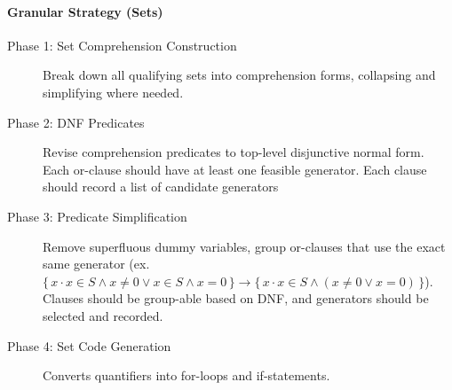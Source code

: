 \documentclass{article}
\newcommand{\bSetT}[2]{%
  \{\, #1 \cdot #2 \,\}%
}
\begin{document}
\paragraph{Granular Strategy (Sets)}
\begin{description}
  \item[Phase 1: Set Comprehension Construction] Break down all qualifying sets into comprehension forms, collapsing and simplifying where needed.
  \item[Phase 2: DNF Predicates] Revise comprehension predicates to top-level disjunctive normal form. Each or-clause should have at least one feasible generator. Each clause should record a list of candidate generators
  \item[Phase 3: Predicate Simplification] Remove superfluous dummy variables, group or-clauses that use the exact same generator (ex. $\bSetT{x}{x \in S \land x \neq 0 \lor x \in S \land x = 0} \rightarrow \bSetT{x}{x \in S \land (x \neq 0 \lor x = 0)}$). Clauses should be group-able based on DNF, and generators should be selected and recorded.
  \item[Phase 4: Set Code Generation] Converts quantifiers into for-loops and if-statements.
\end{description}
\end{document}
